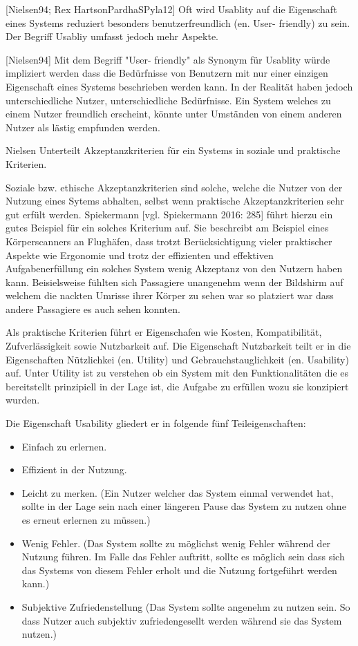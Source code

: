 [Nielsen94; Rex HartsonPardhaSPyla12] Oft wird Usablity auf die Eigenschaft eines Systems reduziert besonders benutzerfreundlich (en. User- friendly) zu sein. Der Begriff Usabliy umfasst jedoch mehr Aspekte. 

[Nielsen94] Mit dem Begriff "User- friendly" als Synonym für Usablity würde impliziert werden dass die Bedürfnisse von Benutzern mit nur einer einzigen Eigenschaft eines Systems beschrieben werden kann. 
In der Realität haben jedoch unterschiedliche Nutzer, unterschiedliche Bedürfnisse. Ein System welches zu einem Nutzer freundlich erscheint, könnte unter Umständen von einem anderen Nutzer als lästig empfunden werden.

Nielsen Unterteilt Akzeptanzkriterien für ein Systems in soziale und praktische Kriterien.

Soziale bzw. ethische Akzeptanzkriterien sind solche, welche  die Nutzer von der Nutzung eines Sytems abhalten, selbst wenn praktische Akzeptanzkriterien sehr gut erfült werden. 
Spiekermann [vgl. Spiekermann 2016: 285] führt hierzu ein gutes Beispiel für ein solches Kriterium auf. Sie beschreibt am Beispiel eines Körperscanners an Flughäfen, dass trotzt  Berücksichtigung vieler 
praktischer Aspekte wie Ergonomie und trotz der effizienten und effektiven Aufgabenerfüllung ein solches System wenig Akzeptanz von den Nutzern haben kann. Beisielsweise fühlten sich Passagiere 
unangenehm wenn der Bildshirm auf welchem die nackten Umrisse ihrer Körper zu sehen war so platziert war dass andere Passagiere es auch sehen konnten.  

Als praktische Kriterien führt er Eigenschafen wie Kosten, Kompatibilität, Zufverlässigkeit sowie Nutzbarkeit auf. 
Die Eigenschaft Nutzbarkeit teilt er in die Eigenschaften Nützlichkei (en. Utility) und Gebrauchstauglichkeit (en. Usability) auf. Unter Utility ist zu verstehen ob ein System mit den Funktionalitäten die es bereitstellt prinzipiell 
in der Lage ist, die Aufgabe zu erfüllen wozu sie konzipiert wurden.

Die Eigenschaft Usability gliedert er in folgende fünf Teileigenschaften: 

\begin{itemize}
	\item Einfach zu erlernen.
	\item Effizient in der Nutzung.
	\item Leicht zu merken. (Ein Nutzer welcher das System einmal verwendet hat, sollte in der Lage sein nach einer längeren Pause das System zu nutzen ohne es erneut erlernen zu müssen.)
	\item Wenig Fehler. (Das System sollte zu möglichst wenig Fehler während der Nutzung führen. Im Falle das Fehler auftritt, sollte es möglich sein dass sich das Systems von diesem Fehler erholt und die Nutzung fortgeführt werden kann.)
	\item Subjektive Zufriedenstellung (Das System sollte angenehm zu nutzen sein. So dass Nutzer auch subjektiv zufriedengesellt werden während sie das System nutzen.)
\end{itemize}

